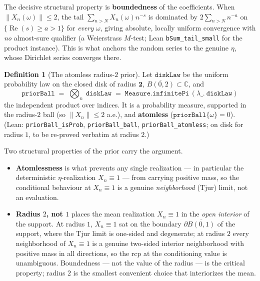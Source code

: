 \documentclass[11pt,a4paper]{article}
\theoremstyle{definition}
\newtheorem{definition}[theorem]{Definition}
\newcommand{\Rea}{\operatorname{Re}}
\begin{document}
The decisive structural property is \textbf{boundedness} of the coefficients. When
\(\|X_n(\omega)\|\le 2\), the tail \(\sum_{n>N}X_n(\omega)n^{-s}\) is dominated by
\(2\sum_{n>N}n^{-a}\) on \(\{\Rea(s)\ge a>1\}\) for \emph{every} \(\omega\), giving
absolute, locally uniform convergence with \emph{no} almost-sure qualifier (a Weierstrass
\(M\)-test; Lean \texttt{bSum\_tail\_small} for the product instance). This is what anchors
the random series to the genuine \(\eta\), whose Dirichlet series converges there.

\begin{definition}[The atomless radius-\(2\) prior]\label{def:prior}
Let \(\texttt{diskLaw}\) be the uniform probability law on the closed disk of radius
\(\mathbf{2}\), \(\overline{B(0,2)}\subset\mathbb{C}\), and
\[
  \texttt{priorBall} \;=\; \bigotimes_{n}\ \texttt{diskLaw}
  \;=\; \texttt{Measure.infinitePi}\,(\lambda\_.\ \texttt{diskLaw})
\]
the independent product over indices. It is a probability measure, supported in the
radius-\(2\) ball (so \(\|X_n\|\le 2\) a.e.), and \textbf{atomless}
(\(\texttt{priorBall}\{\omega\}=0\)). (Lean: \texttt{priorBall\_isProb},
\texttt{priorBall\_ball}, \texttt{priorBall\_atomless}; on disk for radius \(1\), to be
re-proved verbatim at radius \(2\).)
\end{definition}

Two structural properties of the prior carry the argument.

\begin{itemize}
  \item \textbf{Atomlessness} is what prevents any single realization --- in particular
        the deterministic \(\eta\)-realization \(X_n\equiv1\) --- from carrying positive
        mass, so the conditional behaviour at \(X_n\equiv1\) is a genuine
        \emph{neighborhood} (Tjur) limit, not an evaluation.
  \item \textbf{Radius \(2\), not \(1\)} places the mean realization \(X_n\equiv1\) in the
        \emph{open interior} of the support. At radius \(1\), \(X_n\equiv1\) sat on the
        boundary \(\partial\overline{B(0,1)}\) of the support, where the Tjur limit is
        one-sided and degenerate; at radius \(2\) every neighborhood of \(X_n\equiv1\) is a
        genuine two-sided interior neighborhood with positive mass in all directions, so
        the rcp at the conditioning value is unambiguous. Boundedness --- not the value of
        the radius --- is the critical property; radius \(2\) is the smallest convenient
        choice that interiorizes the mean.
\end{itemize}
\end{document}
